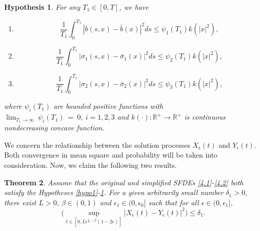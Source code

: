 \documentclass[a4 paper, 12pt]{report}
\theoremstyle{plain}
\newtheorem{theorem}{\textbf{Theorem}}[section]
\newtheorem{hypothesis}[theorem]{\textbf{Hypothesis}}
\begin{document}
\begin{hypothesis}\label{hypo3}
\normalfont
For any $T_1\in[0,T]$, we have
\begin{enumerate}
\item[(i)]
$$
\frac{1}{T_1}\int_0^{T_1}|b(s,x) - \bar{b}(x)|^2ds\leq \psi_1(T_1)k(|x|^2),
$$
\item[(ii)]
$$
\frac{1}{T_1}\int_0^{T_1}|\sigma_1(s,x) - \bar{\sigma}_1(x)|^2ds\leq \psi_2(T_1)k(|x|^2),
$$
\item[(iii)]
$$
\frac{1}{T_1}\int_0^{T_1}|\sigma_2(s,x) - \bar{\sigma}_2(x)|^2ds\leq \psi_3(T_1)k(|x|^2),
$$
\end{enumerate}
where $\psi_i(T_1)$ are bounded positive functions with $\lim_{T_1\rightarrow\infty}~\psi_i(T_1)~ = ~ 0,~i = 1,2,3$ and $k(\cdot):\mathbb{R}^+\rightarrow\mathbb{R}^+$ is continuous nondecreasing concave function.
\end{hypothesis}
\noindent
\par We concern the relationship between the solution processes $X_\epsilon(t)$ and $Y_\epsilon(t)$.\\
Both convergence in mean square and probability will be taken into consideration.
Now, we claim the following two results.
\begin{theorem}\label{4.1}
Assume that the original and simplified SFDEs \eqref{4.1}-\eqref{4.2} both satisfy the Hypotheses \ref{hypo1}-\ref{hypo3}. For a given arbitrarily small number $\delta_1>0$, there exist $L>0,~\beta\in(0,1)$ and $\epsilon_1\in (0,\epsilon_0]$ such that for all $\epsilon\in(0,\epsilon_1]$,
$$
\bigg(\sup_{t\in[0,L\epsilon^{\frac{1}{2} -\beta}(1-2\epsilon)]}|X_\epsilon(t) - Y_\epsilon(t)|^2\bigg)\leq \delta_1.
$$
\end{theorem}
\end{document}
